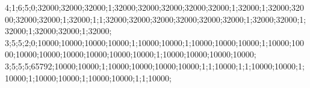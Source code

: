 4;1;6;5;0;32000;32000;32000;1;32000;32000;32000;32000;32000;1;32000;1;32000;32000;32000;32000;1;32000;1;1;32000;32000;32000;32000;32000;32000;1;32000;32000;1;32000;1;32000;32000;1;32000;
3;5;5;2;0;10000;10000;10000;10000;1;10000;10000;1;10000;10000;10000;1;10000;10000;10000;10000;10000;10000;10000;10000;1;10000;10000;10000;10000;
3;5;5;5;65792;10000;10000;1;10000;10000;10000;10000;1;1;10000;1;1;10000;10000;1;10000;1;10000;10000;1;10000;10000;1;1;10000;

